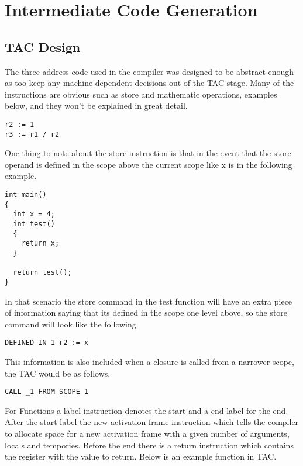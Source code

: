 \documentclass{article}
\begin{document}
\section{Intermediate Code Generation}

\subsection{TAC Design}

The three address code used in the compiler was designed to be abstract enough as
too keep any machine dependent decisions out of the TAC stage. Many of the instructions
are obvious such as store and mathematic operations, examples below, and they won't be explained in
great detail.

\begin{lstlisting}
r2 := 1
r3 := r1 / r2
\end{lstlisting}

One thing to note about the store instruction is that in the event that the store
operand is defined in the scope above the current scope like x is in the following example.

\begin{lstlisting}
int main()
{
  int x = 4;
  int test()
  {
    return x;
  }

  return test();
}
\end{lstlisting}

In that scenario the store command in the test function will have an extra piece
of information saying that its defined in the scope one level above, so the store command will
look like the following.

\begin{lstlisting}
DEFINED IN 1 r2 := x
\end{lstlisting}

This information is also included when a closure is called from a narrower scope,
the TAC would be as follows.

\begin{lstlisting}
CALL _1 FROM SCOPE 1
\end{lstlisting}

For Functions a label instruction denotes the start and a end label for the end.
After the start label the new activation frame instruction which tells
the compiler to allocate space for a new activation frame with a given number
of arguments, locals and tempories. Before the end there is a return instruction
which contains the register with the value to return. Below is an example function
in TAC.
\end{document}
